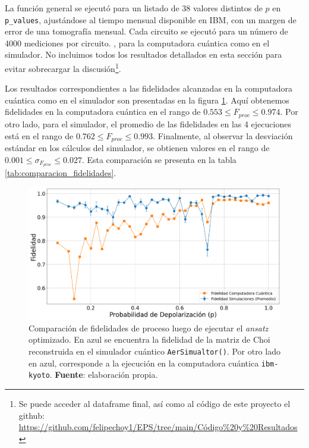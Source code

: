 \documentclass[letterpaper,12pt]{thesisECFM}
\theoremstyle{plain}
\theoremstyle{definition}
\theoremstyle{remark}
\newcommand{\1}{\mathbb{1}}
\begin{document}
La función general se ejecutó para un listado de 38 valores distintos de $p$ en
\texttt{p\_values}, ajustándose al tiempo mensual disponible en IBM, con un
margen de error de una tomografía mensual. Cada circuito se ejecutó para un
número de 4000 mediciones por circuito.  ,
para la computadora cuántica como
en el simulador. No incluimos todos los resultados detallados en esta sección
para evitar sobrecargar la discusión\footnote{Se puede acceder al dataframe
final, así como al código de este proyecto el github:
\href{https://github.com/felipechoy1/EPS/tree/main/Código\%20y\%20Resultados}{https://github.com/felipechoy1/EPS/tree/main/Código\%20y\%20Resultados}}.

Los resultados correspondientes a las fidelidades alcanzadas en la computadora
cuántica como en el simulador son presentadas en la figura
\ref{fig:comparacion_fidelidad}. Aquí obtenemos fidelidades en la computadora
cuántica en el rango de $0.553\leq F_{proc} \leq 0.974$. Por otro lado, para el
simulador, el promedio de las fidelidades en las 4 ejecuciones está en el rango
de $0.762\leq F_{proc} \leq 0.993$. Finalmente, al observar la desviación
estándar en los cálculos del simulador, se obtienen valores en el rango de
$0.001\leq \sigma_{F_{proc}} \leq 0.027$. Esta comparación se presenta en la
tabla \ref{tab:comparacion_fidelidades}.



\begin{figure}[h!] 
    \centering 
    \includegraphics[width=0.7\linewidth]{imagenes/comparacion fidelidad.png}
    \caption{Comparación de fidelidades de proceso luego de ejecutar el \textit{ansatz}
optimizado. En azul se encuentra la fidelidad de la matriz de Choi reconstruida
en el simulador cuántico \texttt{AerSimualtor()}. Por otro lado en azul,
corresponde a la ejecución en la computadora cuántica \texttt{ibm-kyoto}.
\textbf{Fuente}: elaboración propia. }
    \label{fig:comparacion_fidelidad}
    \end{figure}
    
\end{document}
